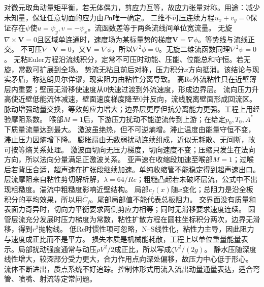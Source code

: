 对微元取角动量矩平衡，若无体偶力，剪应力互等，故应力张量对称。用途：减少未知量，保证任意切面的应力由$P\bm n$唯一确定。
二维不可压连续方程$u_x+v_y=0$保证存在$\psi$使$u=\psi_y,v=-\psi_x$。流函数差等于两条流线间单位宽流量。
无旋$\nabla\times\bm V=0$且区域单连通时，速度场为某标量势的梯度$\bm V=\nabla\phi$。等势线与流线正交。
不可压$\nabla\cdot\bm V=0$，又$\bm V=\nabla\phi$，所以$\nabla^2\phi=0$。无旋二维流函数同理$\nabla^2\psi=0$。
无粘Euler方程沿流线积分，定常不可压时动能、压能、位能总和守恒。若无旋，常数可扩展到全场。
势流无粘且前后对称，压力积分$x$方向抵消。该结论与现实矛盾，称达朗贝尔佯谬，现实阻力由粘性分离导致。
高Re外流粘性只在近壁薄层内重要；壁面无滑移使速度从0快速过渡到外流速度，形成边界层。
流向压力升高使近壁低能流体减速，壁面速度梯度降至0并反向，流线脱离壁面形成回流区。
脉动增强动量交换，等效剪应力增大；边界层更厚但抗分离能力更强。工程上用经验摩阻系数。
喉部$M=1$后，下游压力扰动不能逆流传到上游；在给定$p_0,T_0,A^*$下质量流量达到最大。
激波虽绝热，但不可逆熵增。滞止温度由能量守恒不变，滞止压力因熵增下降。
膨胀扇由无数弱扰动连续组成，近似无耗散、无间断，故可按等熵关系处理。
激波面切向无压力梯度，切向速度不变；压缩只发生在法向方向，所以法向分量满足正激波关系。
亚声速在收缩段加速至喉部$M=1$；过喉后若背压合适，超声速在扩张段继续加速。单纯收缩管不能稳定得到超声速出口。
层流摩阻来自粘性剪切解析解，$\lambda=64/Re$；粗糙凸起若未破坏层流，公式中不出现粗糙度。湍流中粗糙度影响近壁结构。
局部$c_f(x)$随$x$变化；总阻力是沿全板积分的平均效果，所以用$\bar C_f$。尾部局部值不能代表总板阻力。
交界面没有质量和表面力奇异时，切向力平衡要求两侧剪应力相等；同时无滑移要求速度连续。
圆管层流充分发展时压力梯度为常数，粘性扩散方程在圆柱坐标积分两次，边界无滑移，得到$r^2$抛物线。
低Re时惯性项可忽略，N--S线性化，粘性力主导，因此阻力与速度成正比而不是平方。
损失本质是机械能耗散，工程上以单位重量能量表示。局部扰动强度通常与动压$\rho V^2/2$成正比，所以写成$\zeta V^2/(2g)$。
静水压随深度线性增大，较深部分受力更大，合力作用点向深处偏移，故压力中心低于形心。
流体不断进出，质点系统不好追踪。控制体形式用流入流出动量通量表达，适合弯管、喷嘴、射流等定常问题。
